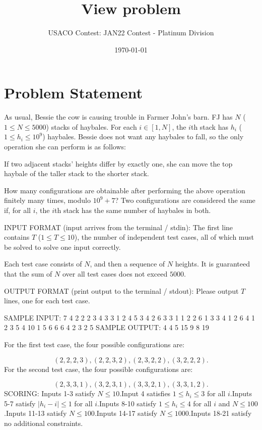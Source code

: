 \documentclass[12pt]{article}
\title{View problem}
\author{USACO Contest: JAN22 Contest - Platinum Division}
\date{\today}
\begin{document}
\maketitle

\section*{Problem Statement}

As usual, Bessie the cow is causing trouble in Farmer John's barn. FJ has $N$
($1\leq N \leq 5000$) stacks of haybales. For each $i\in [1,N]$, the $i$th stack
has $h_i$ ($1\le h_i\le 10^9$) haybales. Bessie does not want any haybales to
fall, so the only operation she can perform is as follows:

If two adjacent stacks' heights differ by exactly one, she can move the top
haybale of the taller stack to the shorter stack.

How many configurations are obtainable after performing the above operation
finitely many times, modulo $10^9+7$? Two configurations are considered the same
if, for all $i$, the $i$th stack has the same number of haybales in both.

INPUT FORMAT (input arrives from the terminal / stdin):
The first line contains $T$ ($1\le T\le 10$), the number of independent test
cases, all of which must be solved to solve one input correctly.

Each test case consists of $N$, and then a sequence of $N$ heights. It is
guaranteed that the sum of $N$ over all test cases does not exceed $5000$.

OUTPUT FORMAT (print output to the terminal / stdout):
Please output $T$ lines, one for each test case.

SAMPLE INPUT:
7
4
2 2 2 3
4
3 3 1 2
4
5 3 4 2
6
3 3 1 1 2 2
6
1 3 3 4 1 2
6
4 1 2 3 5 4
10
1 5 6 6 6 4 2 3 2 5
SAMPLE OUTPUT: 
4
4
5
15
9
8
19

For the first test case, the four possible configurations are:

$$(2,2,2,3), (2,2,3,2), (2,3,2,2), (3,2,2,2).$$
For the second test case, the four possible configurations are:

$$(2,3,3,1),(3,2,3,1),(3,3,2,1), (3,3,1,2).$$
SCORING:
Inputs 1-3 satisfy $N\le 10$.Input 4 satisfies $1\le h_i\le 3$ for all $i$.Inputs 5-7 satisfy $|h_i-i|\le 1$ for all $i$.Inputs 8-10 satisfy $1\le h_i\le 4$ for all $i$ and $N\le 100$.Inputs 11-13 satisfy $N\le 100$.Inputs 14-17 satisfy $N\le 1000$.Inputs 18-21 satisfy no additional constraints.
\end{document}
